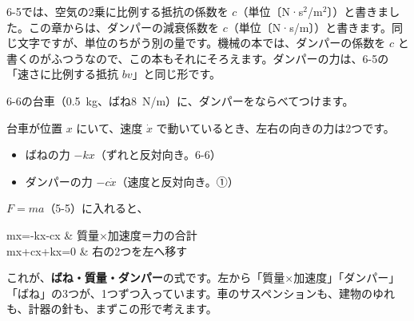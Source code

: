 \begin{seikaku}
6-5では、空気の2乗に比例する抵抗の係数を $c$（単位〔N·s$^2$/m$^2$〕）と書きました。この章からは、ダンパーの減衰係数を $c$（単位〔N·s/m〕）と書きます。同じ文字ですが、単位のちがう別の量です。機械の本では、ダンパーの係数を $c$ と書くのがふつうなので、この本もそれにそろえます。ダンパーの力は、6-5の「速さに比例する抵抗 $bv$」と同じ形です。
\end{seikaku}


\label{bk:6-7:shiki}6-6の台車（\qty{0.5}{kg}、ばね\qty{8}{N/m}）に、ダンパーをならべてつけます。

\begin{bkfigure}
\end{bkfigure}

台車が位置 $x$ にいて、速度 $\dot x$ で動いているとき、左右の向きの力は2つです。
\begin{itemize}[leftmargin=1.2\zw, itemsep=2pt, topsep=2pt, label={\color{\bkTT}●}]
\item ばねの力 $-kx$（ずれと反対向き。6-6）
\item ダンパーの力 $-c\dot x$（速度と反対向き。①）
\end{itemize}
$F=ma$（5-5）に入れると、
\begin{bkhenkei}
m\ddot x=-kx-c\dot x & 質量×加速度＝力の合計 \\
m\ddot x+c\dot x+kx=0 & 右の2つを左へ移す \\
\end{bkhenkei}
これが、\textbf{ばね・質量・ダンパー}の式です。左から「質量×加速度」「ダンパー」「ばね」の3つが、1つずつ入っています。車のサスペンションも、建物のゆれも、計器の針も、まずこの形で考えます。

